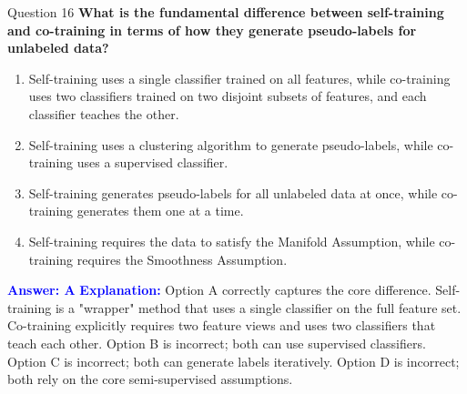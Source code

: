 \documentclass[8pt]{beamer}  %
\begin{document}
	\begin{frame}{Question 16}
		\textbf{What is the fundamental difference between self-training and co-training in terms of how they generate pseudo-labels for unlabeled data?}
		\begin{enumerate}
			\item Self-training uses a single classifier trained on all features, while co-training uses two classifiers trained on two disjoint subsets of features, and each classifier teaches the other.
			\item Self-training uses a clustering algorithm to generate pseudo-labels, while co-training uses a supervised classifier.
			\item Self-training generates pseudo-labels for all unlabeled data at once, while co-training generates them one at a time.
			\item Self-training requires the data to satisfy the Manifold Assumption, while co-training requires the Smoothness Assumption.
		\end{enumerate}
		\vspace{0.2cm}
		\textcolor{blue}{\textbf{Answer: A}}
		\vspace{0.2cm}
		\textcolor{blue}{\textbf{Explanation:}} Option A correctly captures the core difference. Self-training is a "wrapper" method that uses a single classifier on the full feature set. Co-training explicitly requires two feature views and uses two classifiers that teach each other. Option B is incorrect; both can use supervised classifiers. Option C is incorrect; both can generate labels iteratively. Option D is incorrect; both rely on the core semi-supervised assumptions.
	\end{frame}
	
\end{document}
